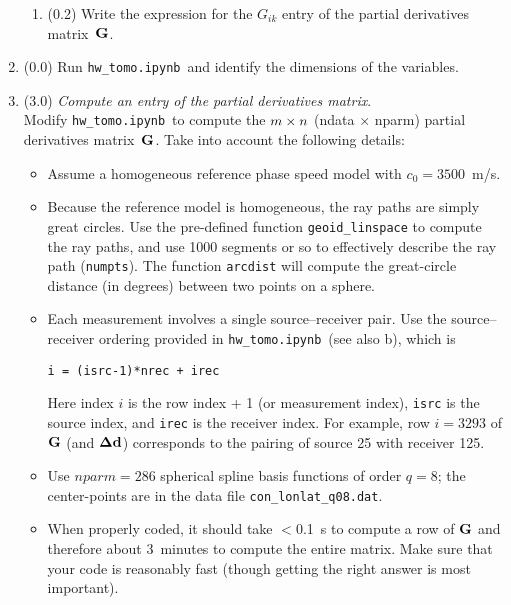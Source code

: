\documentclass[11pt,titlepage,fleqn]{article}
\newcommand{\tfileGik}{{\tt hw\_tomo.ipynb}}
\begin{document}
\begin{enumerate}
\begin{enumerate}
\item (0.2) Write the expression for the $G_{ik}$ entry of the partial derivatives matrix~$\mbox{${\bf G}$}$.
\end{enumerate}


\item (0.0) Run \tfileGik\ and identify the dimensions of the variables.


\item (3.0) {\em Compute an entry of the partial derivatives matrix}. \\
Modify \tfileGik\ to compute the $m \times n$ (ndata $\times$ nparm) partial derivatives matrix~$\mbox{${\bf G}$}$.
Take into account the following details:
%
\begin{itemize}
\item Assume a homogeneous reference phase speed model with $c_0 = 3500$~m/s.

\item Because the reference model is homogeneous, the ray paths are simply great circles.  Use the pre-defined function \verb+geoid_linspace+ to compute the ray paths, and use 1000 segments or so to effectively describe the ray path (\verb+numpts+). The function \verb+arcdist+ will compute the great-circle distance (in degrees) between two points on a sphere.

\item Each measurement involves a single source--receiver pair. Use the source--receiver ordering provided in \tfileGik\ (see also b), which is
%
\begin{verbatim}
i = (isrc-1)*nrec + irec
\end{verbatim}
%
Here index $i$ is the row index + 1 (or measurement index), \verb+isrc+ is the source index, and \verb+irec+ is the receiver index.
For example, row $i=3293$ of $\mbox{${\bf G}$}$ (and $\mbox{\boldmath $\bf \Delta$}\mbox{${\bf d}$}$) corresponds to the pairing of source 25 with receiver 125.

\item Use $nparm=286$ spherical spline basis functions of order $q=8$; the center-points are in the data file \verb+con_lonlat_q08.dat+.

\item When properly coded, it should take $<$0.1~s to compute a row of $\mbox{${\bf G}$}$ and therefore about 3~minutes to compute the entire matrix. Make sure that your code is reasonably fast (though getting the right answer is most important).


\end{itemize}
\end{enumerate}
\end{document}
